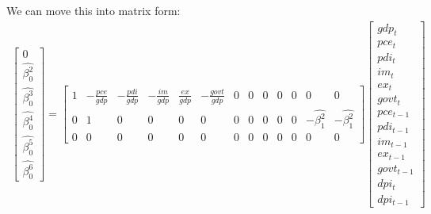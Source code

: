 \documentclass[11pt, letterpaper]{article}\usepackage[]{graphicx}\usepackage[]{color}
\newcommand{\vv}[1]{\textcolor{black}{\mathbf{#1}}}
\begin{document}
We can move this into matrix form:
\setcounter{MaxMatrixCols}{20}
\begin{align*}
\begin{bmatrix}
	0\\
	\widehat{\beta^2_0}\\
	\widehat{\beta^3_0}\\
	\widehat{\beta^4_0}\\
	\widehat{\beta^5_0}\\
	\widehat{\beta^6_0}
\end{bmatrix}
=
\begin{bmatrix}
	1 & -\frac{pce}{gdp} & -\frac{pdi}{gdp} & -\frac{im}{gdp} & \frac{ex}{gdp} & -\frac{govt}{gdp} & 0 & 0 & 0 & 0 & 0 & 0 & 0\\
	0 & 1 & 0 & 0 & 0 & 0 & 0 & 0 & 0 & 0 & 0 & -\widehat{\beta^2_1} & -\widehat{\beta^2_1}\\
	0 & 0 & 0 & 0 & 0 & 0 & 0 & 0 & 0 & 0 & 0 & 0 & 0
\end{bmatrix}
\begin{bmatrix}
	gdp_{t}\\
	pce_{t}\\
	pdi_{t}\\
	im_{t}\\
	ex_{t}\\
	govt_{t}\\
	pce_{t-1}\\
	pdi_{t-1}\\
	im_{t-1}\\
	ex_{t-1}\\
	govt_{t-1}\\
	dpi_{t}\\
	dpi_{t-1}
\end{bmatrix}
\end{align*}
\end{document}
